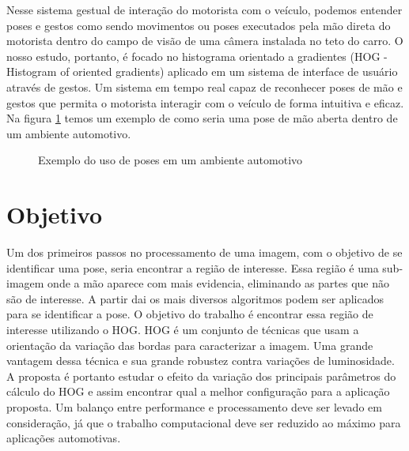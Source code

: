 Nesse sistema gestual de interação do motorista com o veículo, podemos entender poses e gestos como sendo movimentos ou poses executados pela mão direta do motorista dentro do campo de visão de uma câmera instalada no teto do carro.
O nosso estudo, portanto, é focado no histograma orientado a gradientes (HOG - Histogram of oriented gradients) aplicado em um sistema de interface de usuário através de gestos. Um sistema em tempo real capaz de reconhecer poses de mão e gestos que permita o motorista interagir com o veículo de forma intuitiva e eficaz. Na figura \ref{fig:visao_aplicacao} temos um exemplo de como seria uma pose de mão aberta dentro de um ambiente automotivo.

\begin{figure}[ht!]
\centering
{}
  \caption{Exemplo do uso de poses em um ambiente automotivo}
  \label{fig:visao_aplicacao}
\end{figure}

\section{Objetivo}

Um dos primeiros passos no processamento de uma imagem, com o objetivo de se identificar uma pose, seria encontrar a região de interesse. Essa região é uma sub-imagem onde a mão aparece com mais evidencia, eliminando as partes que não são de interesse. A partir dai os mais diversos algoritmos podem ser aplicados para se identificar a pose.
O objetivo do trabalho é encontrar essa região de interesse utilizando o HOG. HOG é um conjunto de técnicas que usam a orientação da variação das bordas para caracterizar a imagem. Uma grande vantagem dessa técnica e sua grande robustez contra variações de luminosidade. A proposta é portanto estudar o efeito da variação dos principais parâmetros do cálculo do HOG e assim encontrar qual a melhor configuração para a aplicação proposta. Um balanço entre performance e processamento deve ser levado em consideração, já que o trabalho computacional deve ser reduzido ao máximo para aplicações automotivas.


